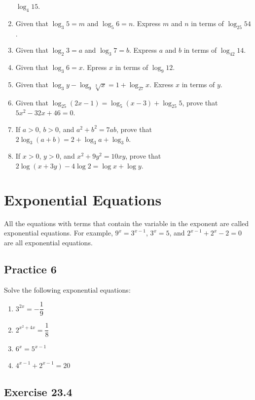 \documentclass[12pt]{report}
\begin{document}
\begin{multicols}{2}
\begin{enumerate}
          $\log_4 15$.
    \item Given that $\log_3 5 = m$ and $\log_5 6 = n$. Express $m$ and $n$ in terms of
          $\log_25 54$.
    \item Given that $\log_2 3 = a$ and $\log_3 7 = b$. Express $a$ and $b$ in terms of
          $\log_42 14$.
    \item Given that $\log_3 6 = x$. Epress $x$ in terms of $\log_9 12$.
    \item Given that $\log_3 y - \log_9 \sqrt[3]{x} = 1 + \log_27 x$. Exress $x$ in terms
          of $y$.
    \item Given that $\log_25(2x - 1) = \log_5(x-3) + \log_25 5$, prove that $5x^2 - 32x
            + 46 = 0$.
    \item If $a > 0$, $b > 0$, and $a^2 + b^2 = 7ab$, prove that $2\log_3(a+b) = 2 +
            \log_3 a + \log_3 b$.
    \item If $x > 0$, $y > 0$, and $x^2 + 9y^2 = 10xy$, prove that $2\log(x+3y) - 4\log2
            = \log x + \log y$.
  \end{enumerate}
\end{multicols}

\section{Exponential Equations}

All the equations with terms that contain the variable in the exponent are
called exponential equations. For example, $9^x = 3^{x-1}$, $3^x = 5$, and
$2^{x-1} + 2^x - 2 = 0$ are all exponential equations.

\subsection*{Practice 6}

\setlength{\columnseprule}{1pt}
\setlength{\columnsep}{24pt}
\begin{multicols}{2}
  Solve the following exponential equations:
  \begin{enumerate}
    \item $3^{2x} = -\dfrac{1}{9}$
    \item $2^{x^2 + 4x} = \dfrac{1}{8}$
    \item $6^x = 5^{x-1}$
    \item $4^{x-1} + 2^{x-1} = 20$
  \end{enumerate}
\end{multicols}

\subsection*{Exercise 23.4}
\end{document}
